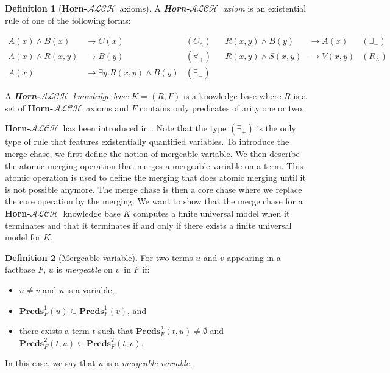 \documentclass{article}
\theoremstyle{definition}
\newtheorem{definition}{Definition}[section]
\theoremstyle{remark}
\newcommand{\Preds}{\textbf{Preds}}
\newcommand{\ALCH}{\textbf{Horn-$\mathcal{ALCH}$}}
\begin{document}
\begin{definition}[\ALCH\ axioms]
A \emph{\ALCH\ axiom} is an existential rule of one of the following forms:

\begin{align*}
A(x) \wedge B(x) &\rightarrow C(x) & (C_\wedge)&& R(x,y) \wedge B(y) &\rightarrow A(x) & (\exists_-) \\
A(x) \wedge R(x,y) &\rightarrow B(y)  & (\forall_+) && R(x,y) \wedge S(x,y) &\rightarrow V(x,y) & (R_\wedge)\\
A(x) &\rightarrow \exists y.R(x,y) \wedge B(y) & (\exists_+)  
\end{align*}



A \emph{\ALCH\ knowledge base} $K = (R,F)$ is a knowledge base where $R$ is a set of \ALCH\ axioms and $F$ contains only predicates of arity one or two. 

\end{definition}

\ALCH\ has been introduced in \cite{Horn-ALC}. Note that the type $(\exists_+)$ is the only type of rule that features existentially quantified variables. To introduce the merge chase, we first define the notion of mergeable variable. We then describe the atomic merging operation that merges a mergeable variable on a term. This atomic operation is used to define the merging that does atomic merging until it is not possible anymore. The merge chase is then a core chase where we replace the core operation by the merging. We want to show that the merge chase for a \ALCH\ knowledge base $K$ computes a finite universal model when it terminates and that it terminates if and only if there exists a finite universal model for $K$. 

\begin{definition}[Mergeable variable]
For two terms $u$ and $v$ appearing in a factbase $F$, $u$ is \emph{mergeable} on $v$\ in $F$ if:
\begin{itemize}
\item $u \neq v$ and $u$ is a variable,
\item $\Preds_{F}^1(u) \subseteq \Preds_{F}^1(v)$, and
\item there exists a term $t$ such that $\Preds^2_{F}(t,u) \neq \emptyset$ and $\Preds_{F}^2(t,u) \subseteq \Preds_{F}^2(t,v)$.
\end{itemize}
In this case, we say that $u$ is a \emph{mergeable variable}.
\end{definition}
\end{document}
